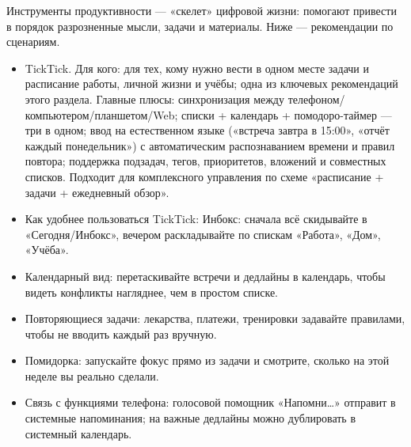 


Инструменты продуктивности — «скелет» цифровой жизни: помогают привести в порядок разрозненные мысли, задачи и материалы. Ниже — рекомендации по сценариям.


\begin{itemize}
  \item TickTick. Для кого: для тех, кому нужно вести в одном месте задачи и расписание работы, личной жизни и учёбы; одна из ключевых рекомендаций этого раздела. Главные плюсы: синхронизация между телефоном/компьютером/планшетом/Web; списки + календарь + помодоро-таймер — три в одном; ввод на естественном языке («встреча завтра в 15:00», «отчёт каждый понедельник») с автоматическим распознаванием времени и правил повтора; поддержка подзадач, тегов, приоритетов, вложений и совместных списков. Подходит для комплексного управления по схеме «расписание + задачи + ежедневный обзор».
  \item Как удобнее пользоваться TickTick: Инбокс: сначала всё скидывайте в «Сегодня/Инбокс», вечером раскладывайте по спискам «Работа», «Дом», «Учёба».
  \item Календарный вид: перетаскивайте встречи и дедлайны в календарь, чтобы видеть конфликты нагляднее, чем в простом списке.
  \item Повторяющиеся задачи: лекарства, платежи, тренировки задавайте правилами, чтобы не вводить каждый раз вручную.
  \item Помидорка: запускайте фокус прямо из задачи и смотрите, сколько на этой неделе вы реально сделали.
  \item Связь с функциями телефона: голосовой помощник «Напомни…» отправит в системные напоминания; на важные дедлайны можно дублировать в системный календарь.
\end{itemize}

